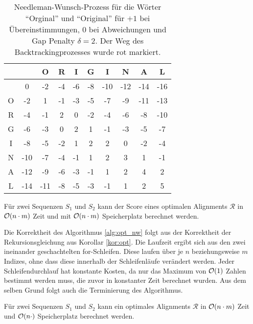 \begin{table}
	\centering
	\begin{tabular}{|c|c|c|c|c|c|c|c|c|c|}
		\hline
		& & O & R & I & G & I & N & A & L \\ \hline
		& \cellcolor{red} 0 & -2 & -4 & -6 & -8 & -10 & -12 & -14 & -16 \\
		O & -2 & \cellcolor{red} 1 & -1 & -3 & -5 & -7 & -9 & -11 & -13 \\
		R & -4 & -1 & \cellcolor{red} 2 & \cellcolor{red} 0 & -2 & -4 & -6 & -8 & -10 \\
		G & -6 & -3 & 0 & 2 & \cellcolor{red} 1 & -1 & -3 & -5 & -7 \\
		I & -8 & -5 & -2 & 1 & 2 & \cellcolor{red} 2 & 0 & -2 & -4 \\
		N & -10 & -7 & -4 & -1 & 1 & 2 & \cellcolor{red} 3 & 1 & -1 \\
		A & -12 & -9 & -6 & -3 & -1 & 1 & 2 & \cellcolor{red} 4 & 2 \\
		L & -14 & -11 & -8 & -5 & -3 & -1 & 1 & 2 & \cellcolor{red} 5 \\		
		\hline
	\end{tabular}
	\caption{Needleman-Wunsch-Prozess für die Wörter \enquote{Orginal} und \enquote{Original} für $+1$ bei Übereinstimmungen, $0$ bei Abweichungen und Gap Penalty $\delta = 2$. Der Weg des Backtrackingprozesses wurde rot markiert.}\label{bsp:nw}
\end{table}

\begin{lemma}
	Für zwei Sequenzen $S_1$ und $S_2$ kann der Score eines optimalen Alignments $\mathcal{R}$ in $\mathcal{O}(n\cdot m)$ Zeit und mit $\mathcal{O}(n\cdot m)$ Speicherplatz berechnet werden.
\end{lemma}

\begin{beweis}
	Die Korrektheit des Algorithmus \ref{alg:opt_nw} folgt aus der Korrektheit der Rekursionsgleichung aus Korollar \ref{kor:opt}. Die Laufzeit ergibt sich aus den zwei ineinander geschachtelten for-Schleifen. Diese laufen über je $n$ beziehungsweise $m$ Indizes, ohne dass diese innerhalb der Schleifenläufe verändert werden. Jeder Schleifendurchlauf hat konstante Kosten, da nur das Maximum von $\mathcal{O}(1)$ Zahlen bestimmt werden muss, die zuvor in konstanter Zeit berechnet wurden. Aus dem selben Grund folgt auch die Terminierung des Algorithmus.
\end{beweis}

\begin{korollar}
	Für zwei Sequenzen $S_1$ und $S_2$ kann ein optimales Alignments $\mathcal{R}$ in $\mathcal{O}(n\cdot m)$ Zeit und $\mathcal{O}(n\cdot)$ Speicherplatz berechnet werden.
\end{korollar}

